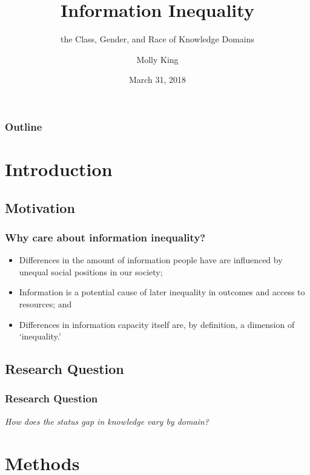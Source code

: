 \documentclass[pdf]{beamer}
\title{Information Inequality}
\subtitle{the Class, Gender, and Race of Knowledge Domains}
\author{Molly King}
\institute{Stanford University}
\date{March 31, 2018}
\begin{document}
\begin{frame}
  \titlepage
\end{frame}


\begin{frame}
\frametitle{Outline}
  \tableofcontents
\end{frame}

\section{Introduction}

\subsection{Motivation}
\begin{frame}
\frametitle{Why care about information inequality?}
  \begin{itemize}
\item
  Differences in the amount of information people have are influenced by
  unequal social positions in our society;
\pause
\item
  Information is a potential cause of later inequality in outcomes and
  access to resources; and
\pause
\item
  Differences in information capacity itself are, by definition, a
  dimension of `inequality.'
  \end{itemize}
\end{frame}


\subsection{Research Question}
\begin{frame}
\frametitle{Research Question}
  \emph{How does the status gap in knowledge vary by domain?}
\end{frame}



\section{Methods}
\end{document}
